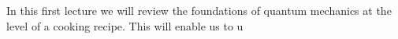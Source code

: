 In this first lecture we will review the foundations of quantum mechanics at the level of a cooking recipe. This will enable us to u